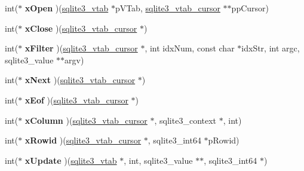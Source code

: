 \begin{DoxyCompactItemize}
\mbox{\label{structsqlite3__module_a3f1e18ef5e5bd4ddbd9500c7cd951f34}} 
int($\ast$ {\bfseries x\+Open} )(\mbox{\hyperlink{structsqlite3__vtab}{sqlite3\+\_\+vtab}} $\ast$p\+V\+Tab, \mbox{\hyperlink{structsqlite3__vtab__cursor}{sqlite3\+\_\+vtab\+\_\+cursor}} $\ast$$\ast$pp\+Cursor)
\item 
\mbox{\label{structsqlite3__module_acc6c4d6d41f3d056e297eea9725b887c}} 
int($\ast$ {\bfseries x\+Close} )(\mbox{\hyperlink{structsqlite3__vtab__cursor}{sqlite3\+\_\+vtab\+\_\+cursor}} $\ast$)
\item 
\mbox{\label{structsqlite3__module_a46ba11ba4d07f7fdcab4f35bf2045300}} 
int($\ast$ {\bfseries x\+Filter} )(\mbox{\hyperlink{structsqlite3__vtab__cursor}{sqlite3\+\_\+vtab\+\_\+cursor}} $\ast$, int idx\+Num, const char $\ast$idx\+Str, int argc, sqlite3\+\_\+value $\ast$$\ast$argv)
\item 
\mbox{\label{structsqlite3__module_a7a95af281219212e50f3417f8c816bfc}} 
int($\ast$ {\bfseries x\+Next} )(\mbox{\hyperlink{structsqlite3__vtab__cursor}{sqlite3\+\_\+vtab\+\_\+cursor}} $\ast$)
\item 
\mbox{\label{structsqlite3__module_afad8fda57fb28a01196230bc554e44b1}} 
int($\ast$ {\bfseries x\+Eof} )(\mbox{\hyperlink{structsqlite3__vtab__cursor}{sqlite3\+\_\+vtab\+\_\+cursor}} $\ast$)
\item 
\mbox{\label{structsqlite3__module_a7cde490d5d06e19b90d768b90991f4a6}} 
int($\ast$ {\bfseries x\+Column} )(\mbox{\hyperlink{structsqlite3__vtab__cursor}{sqlite3\+\_\+vtab\+\_\+cursor}} $\ast$, sqlite3\+\_\+context $\ast$, int)
\item 
\mbox{\label{structsqlite3__module_a26c91e3a8a34d356ff36790488e4acf1}} 
int($\ast$ {\bfseries x\+Rowid} )(\mbox{\hyperlink{structsqlite3__vtab__cursor}{sqlite3\+\_\+vtab\+\_\+cursor}} $\ast$, sqlite3\+\_\+int64 $\ast$p\+Rowid)
\item 
\mbox{\label{structsqlite3__module_aa6c44549a07cc5bf36fae44930069ade}} 
int($\ast$ {\bfseries x\+Update} )(\mbox{\hyperlink{structsqlite3__vtab}{sqlite3\+\_\+vtab}} $\ast$, int, sqlite3\+\_\+value $\ast$$\ast$, sqlite3\+\_\+int64 $\ast$)
$$
\end{DoxyCompactItemize}

